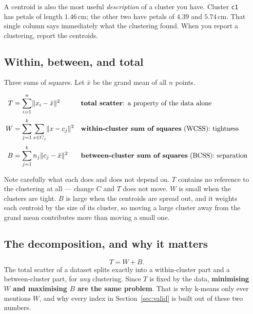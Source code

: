 \documentclass[11pt]{article}
\begin{document}
A centroid is also the most useful \emph{description} of a cluster you have.
Cluster \texttt{c1} has petals of length $1.46$\,cm; the other two have petals
of $4.39$ and $5.74$\,cm. That single column says immediately what the
clustering found. When you report a clustering, report the centroids.

\subsection{Within, between, and total}

Three sums of squares. Let $\bar{x}$ be the grand mean of all $n$ points.

\begin{align}
  T &= \sum_{i=1}^{n} \lVert x_i - \bar{x} \rVert^2
      && \text{\textbf{total scatter}: a property of the data alone}
      \label{eq:T}\\[0.2em]
  W &= \sum_{j=1}^{k} \sum_{x \in C_j} \lVert x - c_j \rVert^2
      && \text{\textbf{within-cluster sum of squares} (WCSS): tightness}
      \label{eq:W}\\[0.2em]
  B &= \sum_{j=1}^{k} n_j \lVert c_j - \bar{x} \rVert^2
      && \text{\textbf{between-cluster sum of squares} (BCSS): separation}
      \label{eq:B}
\end{align}

Note carefully what each does and does not depend on. $T$ contains no
reference to the clustering at all --- change $C$ and $T$ does not move.
$W$ is small when the clusters are tight. $B$ is large when the centroids are
spread out, and it weights each centroid by the size of its cluster, so
moving a large cluster away from the grand mean contributes more than moving a
small one.

\subsection{The decomposition, and why it matters}
\label{sec:decomp}

\begin{keyidea}
\[
  T = W + B .
\]
The total scatter of a dataset splits exactly into a within-cluster part and a
between-cluster part, for \emph{any} clustering. Since $T$ is fixed by the
data, \textbf{minimising $W$ and maximising $B$ are the same problem}. That is
why k-means only ever mentions $W$, and why every index in
Section~\ref{sec:valid} is built out of these two numbers.
\end{keyidea}
\end{document}
